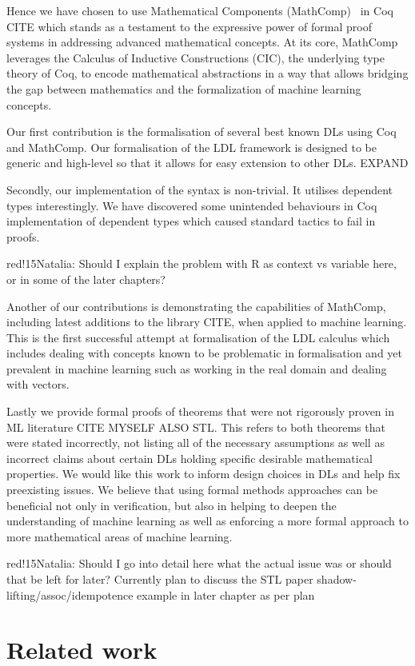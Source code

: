 \documentclass[a4paper,UKenglish,cleveref, autoref, thm-restate]{lipics-v2021}
\newcommand{\natalia}[1]{\begin{authorComment}{red!15}Natalia: #1\end{authorComment}}
\begin{document}
Hence we have chosen to use Mathematical Components (MathComp)~\cite{mathcomp} in Coq CITE which stands as a testament to the expressive power of formal proof systems in addressing advanced mathematical concepts. At its core, MathComp leverages the Calculus of Inductive Constructions (CIC), the underlying type theory of Coq, to encode mathematical abstractions in a way that allows bridging the gap between mathematics and the formalization of machine learning concepts. 


Our first contribution is the formalisation of several best known DLs using Coq and MathComp. Our formalisation of the LDL framework is designed to be generic and high-level so that it allows for easy extension to other DLs. EXPAND

Secondly, our implementation of the syntax is non-trivial. It utilises dependent types interestingly. We have discovered some unintended behaviours in Coq implementation of dependent types which caused standard tactics to fail in proofs. \natalia{Should I explain the problem with R as context vs variable here, or in some of the later chapters?}

Another of our contributions is demonstrating the capabilities of MathComp, including latest additions to the library CITE, when applied to machine learning. This is the first successful attempt at formalisation of the LDL calculus which includes dealing with concepts known to be problematic in formalisation and yet prevalent in machine learning such as working in the real domain and dealing with vectors.

Lastly we provide formal proofs of theorems that were not rigorously proven in ML literature CITE MYSELF ALSO STL. This refers to both theorems that were stated incorrectly, not listing all of the necessary assumptions as well as incorrect claims about certain DLs holding specific desirable mathematical properties. 
We would like this work to inform design choices in DLs and help fix preexisting issues. We believe that using formal methods approaches can be beneficial not only in verification, but also in helping to deepen the understanding of machine learning as well as enforcing a more formal approach to more mathematical areas of machine learning. \natalia{Should I go into detail here what the actual issue was or should that be left for later? Currently plan to discuss the STL paper shadow-lifting/assoc/idempotence example in later chapter as per plan}


\section{Related work}
\end{document}
